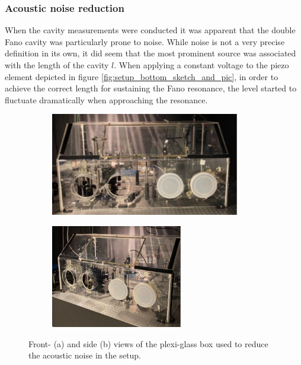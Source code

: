 \subsubsection{Acoustic noise reduction}

When the cavity measurements were conducted it was apparent that the double Fano cavity was particularly prone to noise. While noise is not a very precise definition in its own, it did seem that the most prominent source was associated with the length of the cavity $l$. When applying a constant voltage to the piezo element depicted in figure \ref{fig:setup_bottom_sketch_and_pic}, in order to achieve the correct length for sustaining the Fano resonance, the level started to fluctuate dramatically when approaching the resonance. 

\begin{figure}[h!]
    \centering
    \begin{subfigure}[b]{0.49\textwidth}
        \centering
        \includegraphics[height=4.5cm]{figures/noise_box_front.pdf}
        \caption{}
        \label{fig:box_front}
    \end{subfigure}
    \begin{subfigure}[b]{0.49\textwidth}
        \centering
        \includegraphics[height=4.5cm]{figures/noise_box_side.pdf}
        \caption{}
        \label{fig:box_side}
    \end{subfigure}
    \caption{Front- (a) and side (b) views of the plexi-glass box used to reduce the acoustic noise in the setup.}
    \label{fig:noise_box}
\end{figure}

